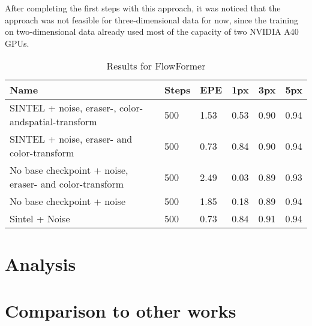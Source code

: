 After completing the first steps with this approach, it was noticed that the approach was not feasible for three-dimensional data for now, since the training on two-dimensional data already used most of the capacity of two NVIDIA A40 GPUs.

\begin{table}[!ht]
	\centering
	\begin{tabular}{|p{7cm}|l|l|l|l|l|}
		\hline
		Name & Steps & EPE & 1px & 3px & 5px \\ \hline\hline
		SINTEL +  noise, eraser-, color- and\newline spatial-transform& 500 & 1.53 & 0.53 & 0.90 & 0.94 \\ \hline
		SINTEL +  noise, eraser- and color-transform & 500 & 0.73 & 0.84 & 0.90 & 0.94 \\ \hline
		No base checkpoint +  noise, eraser- and color-transform & 500 & 2.49 & 0.03 & 0.89 & 0.93 \\ \hline
		No base checkpoint + noise & 500 & 1.85 & 0.18 & 0.89 & 0.94 \\ \hline
		Sintel + Noise& 500 & 0.73 & 0.84 & 0.91 & 0.94 \\ \hline
	\end{tabular}
	
	\caption{\label{tbl:flowformer} Results for FlowFormer}
	
\end{table}

\section{Analysis}
\section{Comparison to other works}

